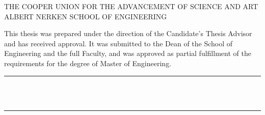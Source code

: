 \thispagestyle{empty}

{
  {
    \MakeUppercase{
      \centering
      The Cooper Union for the Advancement of Science and Art \\
      Albert Nerken School of Engineering \\
    }
  }

  \vs
  
  \noindent{} This thesis was prepared under the direction of the Candidate's Thesis Advisor and has received approval. It was submitted to the Dean of the School of Engineering and the full Faculty, and was approved as partial fulfillment of the requirements for the degree of Master of Engineering.
}

\vfill{}

\begin{singlespace}
  \raggedleft{}
  \rule{0.5\textwidth}{1pt} \\
   \\
\end{singlespace}

\vfill{}

\begin{singlespace}
  \raggedright{}
  \rule{0.5\textwidth}{1pt} \\
   \\
\end{singlespace}

\vfill{}
\vfill{}

